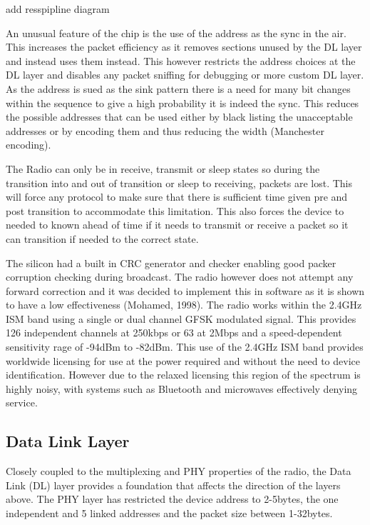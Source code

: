 {add resspipline diagram}


An unusual feature of the chip is the use of the address as the sync in the air. This increases the
packet efficiency as it removes sections unused by the DL layer and instead uses them instead. This
however restricts the address choices at the DL layer and disables any packet sniffing for debugging
or more custom DL layer. As the address is sued as the sink pattern there is a need for many bit
changes within the sequence to give a high probability it is indeed the sync. This reduces the possible
addresses that can be used either by black listing the unacceptable addresses or by encoding them
and thus reducing the width (\eg Manchester encoding).


The Radio can only be in receive, transmit or sleep states so during the transition into and out of
transition or sleep to receiving, packets are lost. This will force any protocol to make sure that there
is sufficient time given pre and post transition to accommodate this limitation. This also forces the
device to needed to known ahead of time if it needs to transmit or receive a packet so it can
transition if needed to the correct state.


The silicon had a built in CRC generator and checker enabling good packer corruption checking
during broadcast. The radio however does not attempt any forward correction and it was decided to
implement this in software as it is shown to have a low effectiveness (Mohamed, 1998).
The radio works within the 2.4GHz ISM band using a single or dual channel GFSK modulated signal.
This provides 126 independent channels at 250kbps or 63 at 2Mbps and a speed-dependent
sensitivity rage of -94dBm to -82dBm. This use of the 2.4GHz ISM band provides worldwide licensing
for use at the power required and without the need to device identification. However due to the
relaxed licensing this region of the spectrum is highly noisy, with systems such as Bluetooth and
microwaves effectively denying service.

\subsection{Data Link Layer}
Closely coupled to the multiplexing and PHY properties of the radio, the Data Link (DL) layer provides
a foundation that affects the direction of the layers above. The PHY layer has restricted the device
address to 2-5bytes, the one independent and 5 linked addresses and the packet size between 1-32bytes.


